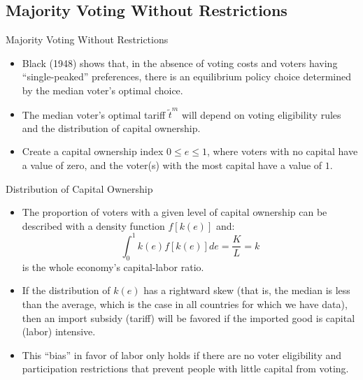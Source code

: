 \documentclass[aspectratio=169]{beamer}
\begin{document}
\subsection{Majority Voting Without Restrictions}


\begin{frame}{Majority Voting Without Restrictions}

\begin{itemize}
    \item<1-> Black (1948) shows that, in the absence of voting costs and voters having ``single-peaked” preferences, there is an equilibrium policy choice determined by the median voter’s optimal choice.
    \item<2-> The median voter’s optimal tariff  $ \tilde{t}^{m} $  will depend on voting eligibility rules and the distribution of capital ownership.
    \item<3-> Create a capital ownership index $ 0 \le e \le 1 $, where voters with no capital have a value of zero, and the voter(s) with the most capital have a value of $ 1 $.
\end{itemize}
    
\end{frame}


\begin{frame}{Distribution of Capital Ownership}

\begin{itemize}
    \item<1-> The proportion of voters with a given level of capital ownership can be described with a density function $ f\left[ k\left( e \right) \right] $ and:
    \begin{equation*}
        \int_{0}^{1} k\left( e \right) f\left[ k \left(e \right) \right] de = \frac{K}{L} = k
    \end{equation*}
    is the whole economy’s capital-labor ratio.
    \item<2-> If the distribution of $ k\left( e \right) $ has a rightward skew (that is, the median is less than the average, which is the case in all countries for which we have data), then an import subsidy (tariff) will be favored if the imported good is capital (labor) intensive.
    \item<3->  This ``bias” in favor of labor only holds if there are no voter eligibility and participation restrictions that prevent people with little capital from voting.  
\end{itemize}
    
\end{frame}
\end{document}
